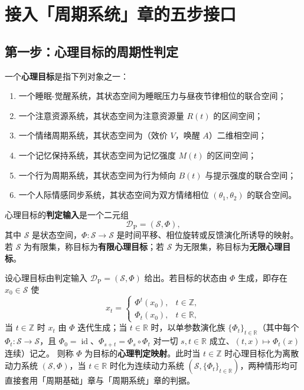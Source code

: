 \section{接入「周期系统」章的五步接口}
\label{sec:psych_five_steps}

\subsection{第一步：心理目标的周期性判定}

\begin{definition}[心理目标与判定输入]\label{def:psych_target}
一个\textbf{心理目标}是指下列对象之一：
\begin{enumerate}[label=(\roman*)]
    \item 一个睡眠-觉醒系统，其状态空间为睡眠压力与昼夜节律相位的联合空间；
    \item 一个注意资源系统，其状态空间为注意资源量 $R(t)$ 的区间空间；
    \item 一个情绪周期系统，其状态空间为（效价 $V$，唤醒 $A$）二维相空间；
    \item 一个记忆保持系统，其状态空间为记忆强度 $M(t)$ 的区间空间；
    \item 一个行为周期系统，其状态空间为行为倾向 $B(t)$ 与提示强度的联合空间；
    \item 一个人际情感同步系统，其状态空间为双方情绪相位 $(\theta_1,\theta_2)$ 的联合空间。
\end{enumerate}
心理目标的\textbf{判定输入}是一个二元组
\[
\mathcal D_{\mathrm{P}}=(\mathcal S,\Phi),
\]
其中 $\mathcal S$ 是状态空间，$\Phi:\mathcal S\to\mathcal S$ 是时间平移、相位旋转或反馈演化所诱导的映射。若 $\mathcal S$ 为有限集，称目标为\textbf{有限心理目标}；若 $\mathcal S$ 为无限集，称目标为\textbf{无限心理目标}。
\end{definition}

\begin{definition}[心理判定映射]\label{def:psych_periodization}
设心理目标由判定输入 $\mathcal D_{\mathrm{P}}=(\mathcal S,\Phi)$ 给出。若目标的状态由 $\Phi$ 生成，即存在 $x_0\in\mathcal S$ 使
\[
x_t=\begin{cases}\Phi^t(x_0), & t\in\mathbb Z,\\ \Phi_t(x_0), & t\in\mathbb R,\end{cases}
\]
当 $t\in\mathbb Z$ 时 $x_t$ 由 $\Phi$ 迭代生成；当 $t\in\mathbb R$ 时，以单参数演化族 $\{\Phi_t\}_{t\in\mathbb R}$（其中每个 $\Phi_t:\mathcal S\to\mathcal S$，且 $\Phi_0=\operatorname{id}$、$\Phi_{s+t}=\Phi_s\circ\Phi_t$ 对一切 $s,t\in\mathbb R$ 成立、$(t,x)\mapsto\Phi_t(x)$ 连续）记之。
则称 $\Phi$ 为目标的\textbf{心理判定映射}。此时当 $t\in\mathbb Z$ 时心理目标化为离散动力系统 $(\mathcal S,\Phi)$，当 $t\in\mathbb R$ 时化为连续动力系统 $(\mathcal S,\{\Phi_t\}_{t\in\mathbb R})$，两种情形均可直接套用「周期基础」章与「周期系统」章的判据。
\end{definition}

